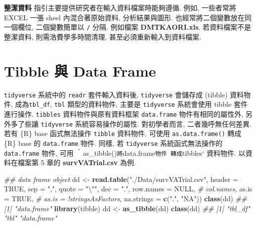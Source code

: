 \documentclass[
]{book}
\newenvironment{Shaded}{\begin{snugshade}}{\end{snugshade}}
\newcommand{\CharTok}[1]{\textcolor[rgb]{0.31,0.60,0.02}{#1}}
\newcommand{\CommentTok}[1]{\textcolor[rgb]{0.56,0.35,0.01}{\textit{#1}}}
\newcommand{\DataTypeTok}[1]{\textcolor[rgb]{0.13,0.29,0.53}{#1}}
\newcommand{\KeywordTok}[1]{\textcolor[rgb]{0.13,0.29,0.53}{\textbf{#1}}}
\newcommand{\NormalTok}[1]{#1}
\newcommand{\OtherTok}[1]{\textcolor[rgb]{0.56,0.35,0.01}{#1}}
\newcommand{\StringTok}[1]{\textcolor[rgb]{0.31,0.60,0.02}{#1}}
\begin{document}
\textbf{整潔資料} 指引主要提供研究者在輸入資料檔案時能夠遵循.
例如, 一些者常將 EXCEL 一張 sheel 內混合著原始資料, 分析結果與圖形.
也經常將二個變數放在同一個欄位, 二個變數簡單以 \texttt{/} 分隔.
例如檔案 \textbf{DMTKAORI.xls}.
若資料檔案不是整潔資料, 則需浩費學多時間清理, 甚至必須重新輸入到資料檔案.

\hypertarget{tibble-ux8207-data-frame}{%
\section{Tibble 與 Data Frame}\label{tibble-ux8207-data-frame}}

\texttt{tidyverse} 系統中的 \texttt{readr} 套件輸入資料後,
\texttt{tidyverse} 會儲存成 (tibble) 資料物件,
成為\texttt{tbl\_df}, \texttt{tbl} 類型的資料物件,
主要是 \texttt{tidyverse} 系統會使用 tibble 套件進行操作.
\texttt{tibbles} 資料物件與原有資料框架 \texttt{data.frame} 物件有相同的屬性外,
另外多了些讓 \texttt{tidyverse} 系統容易操作的屬性.
對初學者而言, 二者幾呼無任何差異.
若有 \{R\} base 函式無法操作 \texttt{tibble} 資料物件,
可使用 \texttt{as.data.frame()}
轉成 \{R\} base 的 \texttt{data.frame} 物件.
同樣, 若 \texttt{tidyverse} 系統函式無法操作的 \texttt{data.frame} 物件,
可用 ‵as\_tibble()\texttt{將}data.frame\texttt{物件\ 轉成}tibbles` 資料物件.
以資料在檔案第 5 章的 \textbf{survVATrial.csv} 為例.

\begin{Shaded}
\begin{Highlighting}[]
\CommentTok{\#\# data frame object}
\NormalTok{dd \textless{}{-}}\StringTok{ }\KeywordTok{read.table}\NormalTok{(}\StringTok{"./Data/survVATrial.csv"}\NormalTok{,}
                 \DataTypeTok{header =} \OtherTok{TRUE}\NormalTok{,}
                 \DataTypeTok{sep =} \StringTok{","}\NormalTok{,}
                 \DataTypeTok{quote =} \StringTok{"}\CharTok{\textbackslash{}"}\StringTok{\textquotesingle{}"}\NormalTok{,}
                 \DataTypeTok{dec =} \StringTok{"."}\NormalTok{,}
                 \DataTypeTok{row.names =} \OtherTok{NULL}\NormalTok{,}
                 \CommentTok{\# col.names,}
                 \DataTypeTok{as.is =} \OtherTok{TRUE}\NormalTok{,}
                 \CommentTok{\# as.is = !stringsAsFactors,}
                 \DataTypeTok{na.strings =} \KeywordTok{c}\NormalTok{(}\StringTok{"."}\NormalTok{, }\StringTok{"NA"}\NormalTok{))}
\KeywordTok{class}\NormalTok{(dd)}
\CommentTok{\#\# [1] "data.frame"}
\KeywordTok{library}\NormalTok{(tibble)}
\NormalTok{dd \textless{}{-}}\StringTok{ }\KeywordTok{as\_tibble}\NormalTok{(dd)}
\KeywordTok{class}\NormalTok{(dd)}
\CommentTok{\#\# [1] "tbl\_df"     "tbl"        "data.frame"}
\end{Highlighting}
\end{Shaded}
\end{document}
